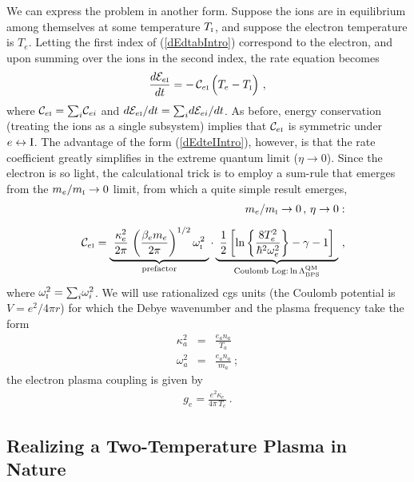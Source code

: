 \documentclass[preprint,12pt,eqsecnum,nofootinbib,amsmath,amssymb]{revtex4}
\newcommand{\smI}{{\rm\scriptscriptstyle I}}
\newcommand{\smQM}{{\rm\scriptscriptstyle QM}}
\newcommand{\smBPS}{{\rm\scriptscriptstyle BPS}}
\begin{document}
We can express the problem in another form. Suppose the ions are in
equilibrium among themselves at some temperature $T_\smI$, and suppose
the electron temperature is $T_e$. Letting the first index of
(\ref{dEdtabIntro}) correspond to the electron, and upon summing over
the ions in the second index, the rate equation becomes
\begin{eqnarray}
  \frac{d{\cal E}_{e\smI}}{dt} 
  = 
  -\,{\cal C}_{e\smI}\,\Big(T_e - T_\smI \Big) \ ,
\label{dEdteIIntro}
\end{eqnarray}
\noindent
where ${\cal C}_{e\smI}={\sum}_i { \cal C}_{ei}$ and $d{\cal
  E}_{e\smI}/dt={\sum}_i d{ \cal E}_{ei}/dt$. As before, energy
conservation (treating the ions as a single subsystem) implies that
${\cal C}_{e\smI}$ is symmetric under $e \leftrightarrow {\rm I}$. The
advantage of the form (\ref{dEdteIIntro}), however, is that the rate
coefficient greatly simplifies in the extreme quantum limit ($\eta \to
0$). Since the electron is so light, the calculational trick is to
employ a sum-rule that emerges from the $m_e/m_\smI \to 0$ limit,
from which a quite simple result emerges, 
\begin{eqnarray}
\nonumber
  && m_e/m_\smI \to 0 \,,\, \eta \to 0: \\[5pt]
  && 
  {\cal C}_{e\smI} 
  = 
  \underbrace{~
  \frac{\kappa_e^2}{2\pi}\,
  \left(\frac{\beta_e m_e}{2\pi} \right)^{1/2} \omega_\smI^2 
  ~}_\text{prefactor}
  \cdot
  \underbrace{~
  \frac{1}{2} \left[ \ln\left\{ \frac{8 T_e^2}{\hbar^2 \omega_e^2}
  \right\} -\gamma -1 \right] 
  ~}_{\text{Coulomb Log:} \ln\Lambda_\smBPS^{\smQM}} 
  \ ,
\end{eqnarray}
\noindent
where $\omega_\smI^2 = {\sum}_i \omega_i^2$.  We will use rationalized
cgs units (the Coulomb potential is $V=e^2/4\pi r$) for which the
Debye wavenumber and the plasma frequency take the form
\begin{eqnarray}
  \kappa_a^2 &=& \frac{e_a n_a}{T_a}
\\[5pt]
  \omega_a^2 &=& \frac{e_a n_a}{m_a} \ ;
\end{eqnarray}
the electron plasma coupling is given by
\begin{eqnarray}
  g_e = \frac{e^2 \kappa_e}{4\pi\, T_e} \ .
\end{eqnarray}

\subsection{Realizing a Two-Temperature Plasma in Nature}
\end{document}
